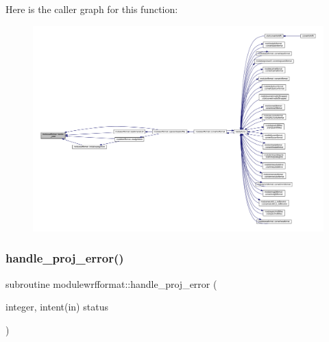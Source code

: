 Here is the caller graph for this function\+:\nopagebreak
\begin{figure}[H]
\begin{center}
\leavevmode
\includegraphics[width=350pt]{namespacemodulewrfformat_a00cdab997f51c9c9b8bf3a5b45ff8969_icgraph}
\end{center}
\end{figure}
\mbox{\label{namespacemodulewrfformat_ae7878b44cc094aa060425acf8605dc33}} 
\subsubsection{\texorpdfstring{handle\+\_\+proj\+\_\+error()}{handle\_proj\_error()}}
{\footnotesize\ttfamily subroutine modulewrfformat\+::handle\+\_\+proj\+\_\+error (\begin{DoxyParamCaption}\item[{integer, intent(in)}]{status }\end{DoxyParamCaption})\hspace{0.3cm}{\ttfamily [private]}}

